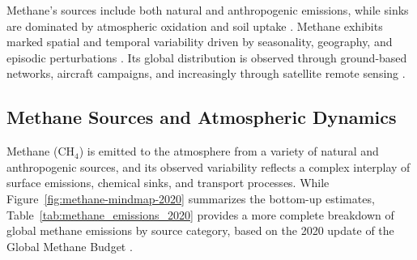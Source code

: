Methane's sources include both natural and anthropogenic emissions, while sinks are dominated by atmospheric oxidation and soil uptake \cite{Saunois2020, global_methane_budget}. Methane exhibits marked spatial and temporal variability driven by seasonality, geography, and episodic perturbations \cite{Pandey2017, feng_tropical_2022}. Its global distribution is observed through ground-based networks, aircraft campaigns, and increasingly through satellite remote sensing \cite{Jacob2022, Lorente2021, Schneising2019}.

\subsection{Methane Sources and Atmospheric Dynamics} 
\label{sec:ch4-sources-dynamics}

Methane (CH$_4$) is emitted to the atmosphere from a variety of natural and anthropogenic sources, and its observed variability reflects a complex interplay of surface emissions, chemical sinks, and transport processes. While Figure~\ref{fig:methane-mindmap-2020} summarizes the bottom-up estimates, Table~\ref{tab:methane_emissions_2020} provides a more complete breakdown of global methane emissions by source category, based on the 2020 update of the Global Methane Budget \cite{global_methane_budget}.

